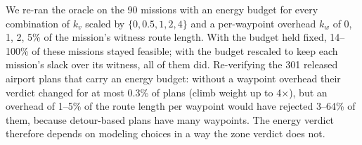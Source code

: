 We re-ran the oracle on the 90 missions with an energy budget for every combination of $k_v$ scaled by $\{0, 0.5, 1, 2, 4\}$ and a per-waypoint overhead $k_w$ of 0, 1, 2, 5\% of the mission's witness route length. With the budget held fixed, 14--100\% of these missions stayed feasible; with the budget rescaled to keep each mission's slack over its witness, all of them did. Re-verifying the 301 released airport plans that carry an energy budget: without a waypoint overhead their verdict changed for at most 0.3\% of plans (climb weight up to 4$\times$), but an overhead of 1--5\% of the route length per waypoint would have rejected 3--64\% of them, because detour-based plans have many waypoints. The energy verdict therefore depends on modeling choices in a way the zone verdict does not.

